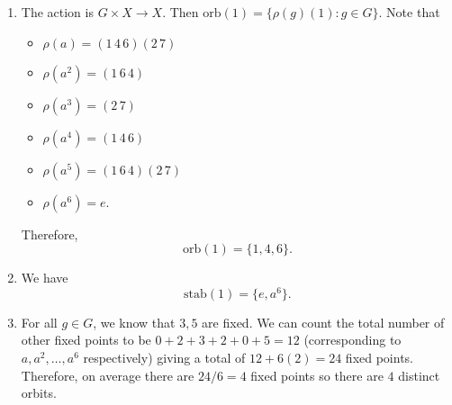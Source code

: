 \begin{sol}
\begin{enumerate}[label=(\alph*)]
    \item The action is $G\times X\rightarrow X$. Then $\text{orb}(1) = \{\rho(g)(1): g\in G\}$. Note that
    \begin{itemize}
        \item $\rho(a) = (1\,4\,6)(2\,7)$
        \item $\rho(a^2) = (1\,6\,4)$
        \item $\rho(a^3) = (2\,7)$
        \item $\rho(a^4) = (1\,4\,6)$
        \item $\rho(a^5) = (1\,6\,4)(2\,7)$
        \item $\rho(a^6) = e$.
    \end{itemize}
    Therefore,
    $$
    \text{orb}(1) = \{1,4,6\}.
    $$
    \item We have
    $$
    \text{stab}(1) = \{e,a^6\}.
    $$
    \item For all $g\in G$, we know that $3,5$ are fixed. We can count the total number of other fixed points to be $0+2+3+2+0+5=12$ (corresponding to $a,a^2,\dots,a^6$ respectively) giving a total of $12+6(2)=24$ fixed points. Therefore, on average there are $24/6=4$ fixed points so there are $4$ distinct orbits.
\end{enumerate}
\end{sol}
